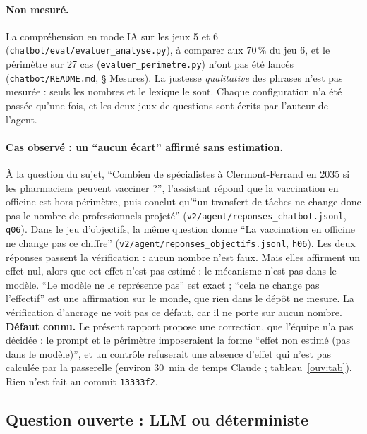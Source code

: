 \paragraph{Non mesuré.}
La compréhension en mode IA sur les jeux 5 et 6 (\texttt{chatbot/\allowbreak{}eval/\allowbreak{}evaluer\_\allowbreak{}analyse.py}), à comparer aux 70\,\%\mesure{} du jeu 6, et le périmètre sur 27\mesure{} cas (\texttt{evaluer\_\allowbreak{}perimetre.py}) n'ont pas été lancés (\texttt{chatbot/\allowbreak{}README.md}, § Mesures).
La justesse \emph{qualitative} des phrases n'est pas mesurée : seuls les nombres et le lexique le sont.
Chaque configuration n'a été passée qu'une fois, et les deux jeux de questions sont écrits par l'auteur de l'agent.

\paragraph{Cas observé : un \enquote{aucun écart} affirmé sans estimation.}\label{pro:cas-ecart}
À la question du sujet, \enquote{Combien de spécialistes à Clermont-Ferrand en 2035 si les pharmaciens peuvent vacciner ?}, l'assistant répond que la vaccination en officine est hors périmètre, puis conclut qu'\enquote{un transfert de tâches ne change donc pas le nombre de professionnels projeté} (\texttt{v2/\allowbreak{}agent/\allowbreak{}reponses\_\allowbreak{}chatbot.jsonl}, \texttt{q06}).
Dans le jeu d'objectifs, la même question donne \enquote{La vaccination en officine ne change pas ce chiffre} (\texttt{v2/\allowbreak{}agent/\allowbreak{}reponses\_\allowbreak{}objectifs.jsonl}, \texttt{h06}).
Les deux réponses passent la vérification : aucun nombre n'est faux.
Mais elles affirment un effet nul, alors que cet effet n'est pas estimé : le mécanisme n'est pas dans le modèle.
\enquote{Le modèle ne le représente pas} est exact ; \enquote{cela ne change pas l'effectif} est une affirmation sur le monde, que rien dans le dépôt ne mesure.
La vérification d'ancrage ne voit pas ce défaut, car il ne porte sur aucun nombre.
\textbf{Défaut connu.} Le présent rapport propose une correction, que l'équipe n'a pas décidée : le prompt et le périmètre imposeraient la forme \enquote{effet non estimé (pas dans le modèle)}, et un contrôle refuserait une absence d'effet qui n'est pas calculée par la passerelle (environ 30\suppose{}~min de temps Claude ; tableau~\ref{ouv:tab}). Rien n'est fait au commit \texttt{13333f2}.

\subsection{Question ouverte : LLM ou déterministe}\label{pro:llm-det}

